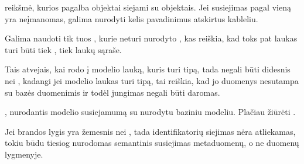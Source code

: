 \documentclass[letterpaper,10pt,lithuanian]{sphinxmanual}
\begin{document}
\begin{fulllineitems}
\label{\detokenize{dimensijos:base.ref}}
\pysigstartsignatures
{}
\pysigstopsignatures
\sphinxAtStartPar
{\hyperref[\detokenize{dimensijos:model.property}]{}} reikšmė, kurios pagalba {\hyperref[\detokenize{formatas:model}]{}} objektai
siejami su {\hyperref[\detokenize{formatas:base}]{}} objektais. Jei susiejimas pagal vieną {\hyperref[\detokenize{dimensijos:model.property}]{}}
yra neįmanomas, galima nurodyti kelis {\hyperref[\detokenize{dimensijos:model.property}]{}} pavadinimus
atskirtus kableliu.

\sphinxAtStartPar
Galima naudoti tik tuos {\hyperref[\detokenize{dimensijos:model.property}]{}}, kurie neturi nurodyto
{\hyperref[\detokenize{dimensijos:property.type}]{}}, kas reiškia, kad toks pat laukas turi būti tiek
{\hyperref[\detokenize{formatas:base}]{}}, tiek {\hyperref[\detokenize{formatas:model}]{}} laukų sąraše.

\sphinxAtStartPar
Tais atvejais, kai {\hyperref[\detokenize{dimensijos:base.ref}]{}} rodo į modelio lauką, kuris turi tipą,
tada {\hyperref[\detokenize{dimensijos:base.level}]{}} negali būti didesnis nei , kadangi jei modelio
laukas turi tipą, tai reiškia, kad jo duomenys nesutampa su bazės
duomenimis ir todėl jungimas negali būti daromas.

\end{fulllineitems}


\begin{fulllineitems}
\label{\detokenize{dimensijos:base.level}}
\pysigstartsignatures
{}
\pysigstopsignatures
\sphinxAtStartPar
{\hyperref[\detokenize{branda:level}]{}}, nurodantis modelio susiejamumą su nurodytu
baziniu modeliu. Plačiau žiūrėti {\hyperref[\detokenize{identifikatoriai:ref-level}]{}}.

\sphinxAtStartPar
Jei brandos lygis yra žemesnis nei , tada identifikatorių siejimas nėra
atliekamas, tokiu būdu tiesiog nurodomas semantinis susiejimas metaduomenų,
o ne duomenų lygmenyje.

\end{fulllineitems}
\end{document}
